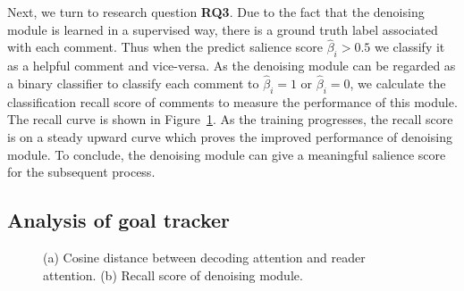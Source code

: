 \documentclass[letterpaper]{article} %
\begin{document}
Next, we turn to research question \textbf{RQ3}.
Due to the fact that the denoising module is learned in a supervised way, there is a ground truth label associated with each comment.
Thus when the predict salience score $\hat{\beta}_i > 0.5$ we classify it as a helpful comment and vice-versa.
As the denoising module can be regarded as a binary classifier to classify each comment to $\hat{\beta}_i = 1$ or $\hat{\beta}_i = 0$, we calculate the classification recall score of comments to measure the performance of this module.
The recall curve is shown in Figure~\ref{fig:subfig}.
As the training progresses, the recall score is on a steady upward curve which proves the improved performance of denoising module.
To conclude, the denoising module can give a meaningful salience score for the subsequent process.

\subsection{Analysis of goal tracker}


\begin{figure} 
  \centering 
  \caption{(a) Cosine distance between decoding attention and reader attention. (b) Recall score of denoising module.} 
  \label{fig:subfig} %
\end{figure}
\end{document}
